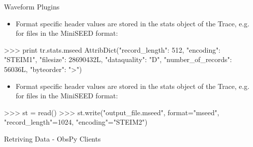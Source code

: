 \begin{frame}{Waveform Plugins}
    \begin{itemize}
        \item Format specific header values are stored in the stats object of the Trace, e.g. for files in the MiniSEED format:
    \end{itemize}
\begin{myColorBox}{0.95}{}
\begin{python}
>>> print tr.stats.mseed
AttribDict({"record_length": 512, "encoding": "STEIM1",
    "filesize": 28690432L, "dataquality": "D",
    "number_of_records": 56036L, "byteorder": ">"})
\end{python}
\end{myColorBox}

    \begin{itemize}
        \item Format specific header values are stored in the stats object of the Trace, e.g. for files in the MiniSEED format:
    \end{itemize}

\begin{myColorBox}{0.95}{}
\begin{python}
>>> st = read()
>>> st.write("output_file.mseed", format="mseed",
    "record_length"=1024, "encoding"="STEIM2")
\end{python}
\end{myColorBox}

\end{frame}


\begin{frame}{}
    \begin{center}
        \textcolor{lmu@darkgreen}{\LARGE{Retriving Data - ObsPy Clients}}
    \end{center}
\end{frame}

